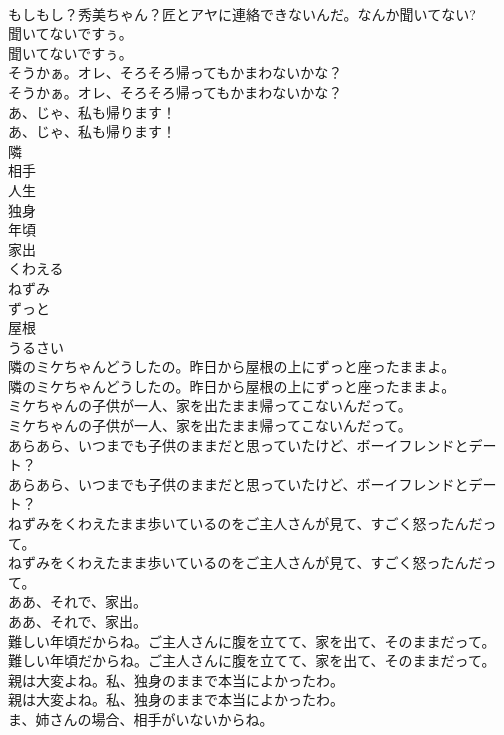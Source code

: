 \documentclass[8pt]{extreport}
\begin{document}
\begin{CJK}{UTF8}{min}
\\	もしもし？秀美ちゃん？匠とアヤに連絡できないんだ。なんか聞いてない? 
\\	聞いてないですぅ。	
\\	聞いてないですぅ。 
\\	そうかぁ。オレ、そろそろ帰ってもかまわないかな？	
\\	そうかぁ。オレ、そろそろ帰ってもかまわないかな？ 
\\	あ、じゃ、私も帰ります！	
\\	あ、じゃ、私も帰ります！ 
\\	隣
\\	相手
\\	人生
\\	独身
\\	年頃
\\	家出
\\	くわえる
\\	ねずみ
\\	ずっと
\\	屋根
\\	うるさい
\\	隣のミケちゃんどうしたの。昨日から屋根の上にずっと座ったままよ。	
\\	隣のミケちゃんどうしたの。昨日から屋根の上にずっと座ったままよ。 
\\	ミケちゃんの子供が一人、家を出たまま帰ってこないんだって。	
\\	ミケちゃんの子供が一人、家を出たまま帰ってこないんだって。 
\\	あらあら、いつまでも子供のままだと思っていたけど、ボーイフレンドとデート？	
\\	あらあら、いつまでも子供のままだと思っていたけど、ボーイフレンドとデート？ 
\\	ねずみをくわえたまま歩いているのをご主人さんが見て、すごく怒ったんだって。	
\\	ねずみをくわえたまま歩いているのをご主人さんが見て、すごく怒ったんだって。 
\\	ああ、それで、家出。	
\\	ああ、それで、家出。 
\\	難しい年頃だからね。ご主人さんに腹を立てて、家を出て、そのままだって。	
\\	難しい年頃だからね。ご主人さんに腹を立てて、家を出て、そのままだって。 
\\	親は大変よね。私、独身のままで本当によかったわ。	
\\	親は大変よね。私、独身のままで本当によかったわ。 
\\	ま、姉さんの場合、相手がいないからね。	

\end{CJK}
\end{document}
